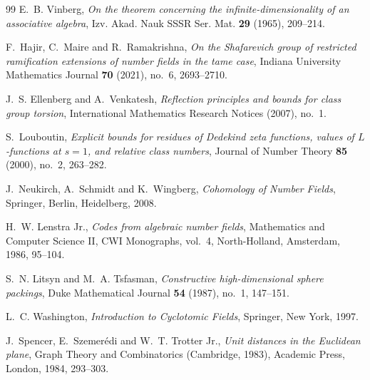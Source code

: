 \documentclass[11pt]{amsart}
\begin{document}
\begin{thebibliography}{99}
E.~B. Vinberg,
\emph{On the theorem concerning the infinite-dimensionality of an associative algebra},
Izv. Akad. Nauk SSSR Ser. Mat. \textbf{29} (1965), 209--214.

F.~Hajir, C.~Maire and R.~Ramakrishna,
\emph{On the Shafarevich group of restricted ramification extensions of number fields in the tame case},
Indiana University Mathematics Journal \textbf{70} (2021), no.~6, 2693--2710.

J.~S. Ellenberg and A.~Venkatesh,
\emph{Reflection principles and bounds for class group torsion},
International Mathematics Research Notices (2007), no.~1.

S.~Louboutin,
\emph{Explicit bounds for residues of Dedekind zeta functions, values of {$L$}-functions at {$s=1$}, and relative class numbers},
Journal of Number Theory \textbf{85} (2000), no.~2, 263--282.

J.~Neukirch, A.~Schmidt and K.~Wingberg,
\emph{Cohomology of Number Fields},
Springer, Berlin, Heidelberg, 2008.

H.~W. Lenstra Jr.,
\emph{Codes from algebraic number fields},
Mathematics and Computer Science II, CWI Monographs, vol.~4, North-Holland, Amsterdam, 1986, 95--104.

S.~N. Litsyn and M.~A. Tsfasman,
\emph{Constructive high-dimensional sphere packings},
Duke Mathematical Journal \textbf{54} (1987), no.~1, 147--151.

L.~C. Washington,
\emph{Introduction to Cyclotomic Fields},
Springer, New York, 1997.

J.~Spencer, E.~Szemer\'edi and W.~T. Trotter Jr.,
\emph{Unit distances in the Euclidean plane},
Graph Theory and Combinatorics (Cambridge, 1983), Academic Press, London, 1984, 293--303.

\end{thebibliography}
\end{document}
